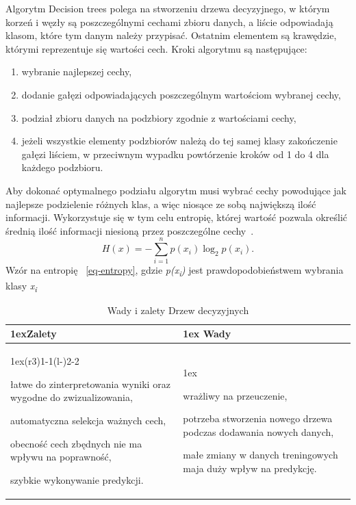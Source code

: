 Algorytm Decision trees polega na stworzeniu drzewa decyzyjnego, w którym korzeń i węzły
są poszczególnymi cechami zbioru danych, a liście odpowiadają klasom, które tym danym 
należy przypisać. Ostatnim elementem są krawędzie, którymi reprezentuje się wartości cech. 
Kroki algorytmu są następujące:
\begin{enumerate}
    \item wybranie najlepszej cechy,
    \item dodanie gałęzi odpowiadających poszczególnym wartościom wybranej cechy,
    \item podział zbioru danych na podzbiory zgodnie z wartościami cechy,
    \item jeżeli wszystkie elementy podzbiorów należą do tej samej klasy 
    zakończenie gałęzi liściem, w przeciwnym wypadku powtórzenie kroków 
    od 1 do 4 dla każdego podzbioru.
\end{enumerate}
Aby dokonać optymalnego podziału algorytm musi wybrać cechy powodujące jak najlepsze
podzielenie różnych klas, a więc niosące ze sobą największą ilość informacji.
Wykorzystuje się w tym celu entropię, której wartość pozwala określić średnią ilość 
informacji niesioną przez poszczególne cechy~\cite{MLAlgorithms}.
\begin{equation}
    H(x)=-\sum_{i=1}^n p(x_i) \log_2 p(x_i).
    \label{eq-entropy}
\end{equation}
Wzór na entropię ~\ref{eq-entropy}, gdzie \textit{p(x\textsubscript{i})} jest prawdopodobieństwem
wybrania klasy \textit{x\textsubscript{i}}
\begin{table}[h]
    \begin{tabularx}{\linewidth}{>{\parskip1ex}X@{\kern4\tabcolsep}>{\parskip1ex}X}
    \toprule
    \hfil\bfseries Zalety
    &
    \hfil\bfseries Wady
    \\\cmidrule(r{3\tabcolsep}){1-1}\cmidrule(l{-\tabcolsep}){2-2}
    
    łatwe do zinterpretowania wyniki oraz wygodne do zwizualizowania,\par
    automatyczna selekcja ważnych cech,\par 
    obecność cech zbędnych nie ma wpływu na poprawność,\par
    szybkie wykonywanie predykcji.\par
    &
    
    wrażliwy na przeuczenie,\par
    potrzeba stworzenia nowego drzewa podczas dodawania nowych danych,\par
    małe zmiany w danych treningowych maja duży wpływ na predykcję.\par
    
    \\\bottomrule
    \end{tabularx}
    \caption{Wady i zalety Drzew decyzyjnych}
\end{table}

